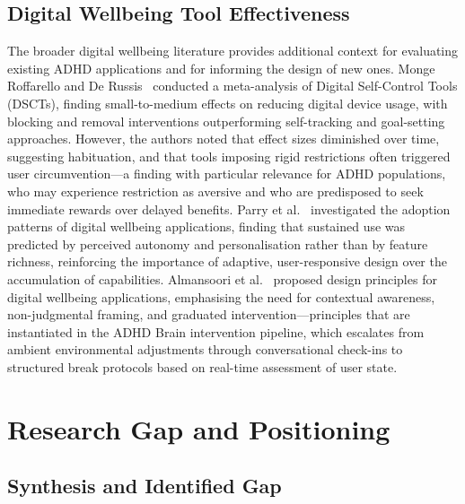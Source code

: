 \subsection{Digital Wellbeing Tool Effectiveness}
\label{sec:litrev_wellbeing_effectiveness}

The broader digital wellbeing literature provides additional context for evaluating existing ADHD applications and for informing the design of new ones. Monge Roffarello and De Russis~\cite{mongeroffarello2023} conducted a meta-analysis of Digital Self-Control Tools (DSCTs), finding small-to-medium effects on reducing digital device usage, with blocking and removal interventions outperforming self-tracking and goal-setting approaches. However, the authors noted that effect sizes diminished over time, suggesting habituation, and that tools imposing rigid restrictions often triggered user circumvention---a finding with particular relevance for ADHD populations, who may experience restriction as aversive and who are predisposed to seek immediate rewards over delayed benefits. Parry et al.~\cite{parry2022} investigated the adoption patterns of digital wellbeing applications, finding that sustained use was predicted by perceived autonomy and personalisation rather than by feature richness, reinforcing the importance of adaptive, user-responsive design over the accumulation of capabilities. Almansoori et al.~\cite{almansoori2023} proposed design principles for digital wellbeing applications, emphasising the need for contextual awareness, non-judgmental framing, and graduated intervention---principles that are instantiated in the ADHD Brain intervention pipeline, which escalates from ambient environmental adjustments through conversational check-ins to structured break protocols based on real-time assessment of user state.

\section{Research Gap and Positioning}
\label{sec:litrev_gap}

\subsection{Synthesis and Identified Gap}
\label{sec:litrev_synthesis}

